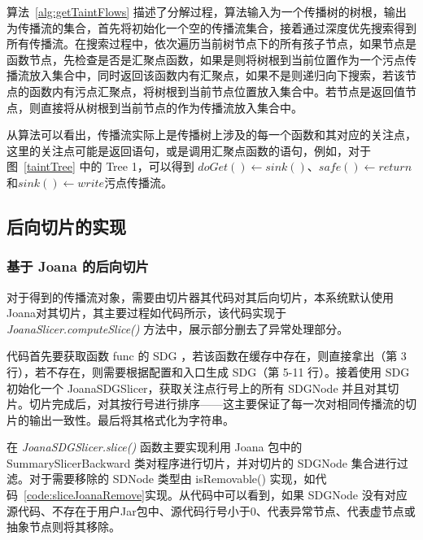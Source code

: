 算法~\ref{alg:getTaintFlows} 描述了分解过程，算法输入为一个传播树的树根，输出为传播流的集合，首先将初始化一个空的传播流集合，接着通过深度优先搜索得到所有传播流。在搜索过程中，依次遍历当前树节点下的所有孩子节点，如果节点是函数节点，先检查是否是汇聚点函数，如果是则将树根到当前位置作为一个污点传播流放入集合中，同时返回该函数内有汇聚点，如果不是则递归向下搜索，若该节点的函数内有污点汇聚点，将树根到当前节点位置放入集合中。若节点是返回值节点，则直接将从树根到当前节点的作为传播流放入集合中。

从算法可以看出，传播流实际上是传播树上涉及的每一个函数和其对应的关注点，这里的关注点可能是返回语句，或是调用汇聚点函数的语句，例如，对于图~\ref{taintTree} 中的 Tree 1，可以得到 $doGet() \leftarrow sink()$、$safe() \leftarrow return$和$sink() \leftarrow write$污点传播流。\\

\subsection{后向切片的实现}
\subsubsection{基于 Joana 的后向切片}
对于得到的传播流对象，需要由切片器其代码对其后向切片，本系统默认使用Joana对其切片，其主要过程如代码所示，该代码实现于 \textit{JoanaSlicer.computeSlice()} 方法中，展示部分删去了异常处理部分。

\begin{minipage}[!htbp]{0.9\textwidth}
    
\end{minipage}

代码首先要获取函数 func 的 SDG ，若该函数在缓存中存在，则直接拿出（第 3 行），若不存在，则需要根据配置和入口生成 SDG（第 5-11 行）。接着使用 SDG 初始化一个 JoanaSDGSlicer，获取关注点行号上的所有 SDGNode 并且对其切片。切片完成后，对其按行号进行排序——这主要保证了每一次对相同传播流的切片的输出一致性。最后将其格式化为字符串。

在 \textit{JoanaSDGSlicer.slice()} 函数主要实现利用 Joana 包中的 SummarySlicerBackward 类对程序进行切片，并对切片的 SDGNode 集合进行过滤。对于需要移除的 SDNode 类型由 isRemovable() 实现，如代码~\ref{code:sliceJoanaRemove}实现。从代码中可以看到，如果 SDGNode 没有对应源代码、不存在于用户Jar包中、源代码行号小于0、代表异常节点、代表虚节点或抽象节点则将其移除。

\begin{minipage}[!htbp]{0.9\textwidth}
    
\end{minipage}


